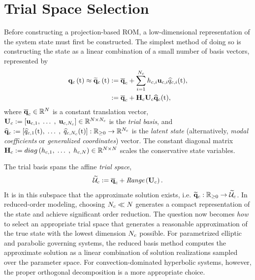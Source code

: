 \section{Trial Space Selection}
%
Before constructing a projection-based ROM, a low-dimensional representation of the system state must first be constructed. The simplest method of doing so is constructing the state as a linear combination of a small number of basis vectors, represented by
%
\begin{equation}\label{eq:consSolApprox}
    \begin{aligned}
        \consFunc{\timeVar} \approx \consFuncRom{\timeVar} &\defEq \consVecCent + \sum_{\dummyIdx=1}^{\numConsModes} \consScaleVar{\dummyIdx} \consTrialVecIdx \consVarCoefIdx (\timeVar), \\
        &\defEq \consAffineMap(\timeVar),
    \end{aligned}
\end{equation}
%
where $\mathbf{\overline{q}}_{c} \in \mathbb{R}^{N}$ is a constant translation vector, $\consTrial \defEq \left[\consTrialVec{1}, \; \hdots \;, \; \consTrialVec{\numConsModes}\right] \inRTwo{\numDOF}{\numConsModes}$ is the \textit{trial basis}, and $\mathbf{\widehat{q}}_{c} := \left[\widehat{q}_{c,1}(\text{t}), \;\hdots \;, \;\widehat{q}_{c,N_c}(\text{t})\right]: \mathbb{R}_{\ge 0} \rightarrow \mathbb{R}^{N_c}$ is the \textit{latent state} (alternatively, \textit{modal coefficients} or \textit{generalized coordinates}) vector. The constant diagonal matrix $\consScale \defEq diag\left(\consScaleVar{1}, \; \hdots \;, \; \consScaleVar{\numDOF}\right) \inRTwo{\numDOF}{\numDOF}$ scales the conservative state variables.

The trial basis spans the affine \textit{trial space},
%
\begin{equation}
    \consTrialSpace \defEq \consVecCent + \textit{Range}\left(\consTrial\right).
\end{equation}
%
It is in this subspace that the approximate solution exists, i.e. $\funcMap{\consVecRom}{\nonnegReals}{\consTrialSpace}$. In reduced-order modeling, choosing $N_c \ll N$ generates a compact representation of the state and achieve significant order reduction. The question now becomes \textit{how} to select an appropriate trial space that generates a reasonable approximation of the true state with the lowest dimension $N_c$ possible. For parametrized elliptic and parabolic governing systems, the reduced basis method computes the approximate solution as a linear combination of solution realizations sampled over the parameter space. For convection-dominated hyperbolic systems, however, the proper orthogonal decomposition is a more appropriate choice.


